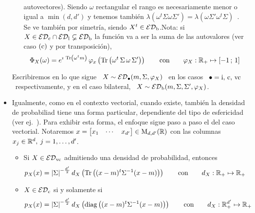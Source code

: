 \begin{itemize}
\begin{itemize}
  autovectores). Siendo $\omega$ rectangular  el rango es necesariamente menor o
  igual  a  $\min(d,d')$ y  tenemos  tambi\'en  $\lambda(\omega^t \Sigma  \omega
  \Sigma')          =          \lambda(\omega          \Sigma'          \omega^t
  \Sigma)$~\cite[Teo.~21.10.1(2)]{Har08}.   Se   ve  tambi\'en  por  simetr\'ia,
  siendo  $X^t \in  \mathcal{ED}_{\mathrm{b}}$.\newline Nota:  si $X  \in \mathcal{ED}_{\mathrm{c}}  \cap \mathcal{ED}_{\mathrm{l}}
  \varsubsetneq \mathcal{ED}_{\mathrm{b}}$ la funci\'on va a  ser la suma de las autovalores (ver
  caso $(\mathrm{c})$ y por transposici\'on), \ie
  \[
  \Phi_X(\omega) = e^{\imath \, \operatorname{Tr}\left( \omega^t m \right)} \, \varphi_x\left(
    \operatorname{Tr}\left( \omega^t \, \Sigma \, \omega \, \Sigma' \right) \right) \qquad
  \mbox{con} \qquad \varphi_X: \mathbb{R}_+ \mapsto [-1 \, ; \, 1]
  \]
  \end{itemize}
  Escribiremos en lo  que sigue \ $X \sim  \mathcal{ED}_\bullet(m,\Sigma,\varphi_X)$ \ en
  los casos  \ $\bullet = \mathrm{i},  \, \mathrm{c}, \,  \mathrm{vc}$ \ respectivamente, y  en el
  caso bilateral, \ $X \sim \mathcal{ED}_{\mathrm{b}}(m,\Sigma,\Sigma',\varphi_X)$.
%
\item Igualmente,  como en  el contexto vectorial,  cuando existe,  tambi\'en la
  densidad de  probabiliad tiene una  forma particular, dependiente del  tipo de
  esfericidad (ver ej.~\cite{Chm80, FraNg80, Kar81:1, Kar81, FanChe84, JenGoo81,
    GupNag99}). Para  exhibir esta forma,  el enfoque sigue  paso a paso  el del
  caso   vectorial.   Notaremos   $x   =   \begin{bmatrix}  x_1   &   \cdots   &
    x_{d'}  \end{bmatrix}  \in \mathrm{M}_{d,d'}(\mathbb{R})$  con  las  columnas $x_j  \in
  \mathbb{R}^d, \: j = 1, \ldots , d'$.
  \begin{itemize}
  \item Si  $X \in \mathcal{ED}_{\mathrm{vc}}$  admitiendo una densidad  de probabilidad,
    entonces
  \[
  p_X(x)  = \left|  \Sigma \right|^{-\frac{d'}{2}}  d_X\left(  \operatorname{Tr}\left( (x-m)^t
      \Sigma^{-1} (x-m)  \right) \right)  \qquad \mbox{con} \qquad  d_X: \mathbb{R}_+
  \mapsto \mathbb{R}_+
  \]
  \item $X \in \mathcal{ED}_{\mathrm{c}}$ si y solamente si
  \[
  p_X(x) =  \left| \Sigma \right|^{-\frac{d'}{2}}  d_X\left( \operatorname{diag}\left( (x-m)^t
      \Sigma^{-1}   (x-m)  \right)   \right)  \qquad   \mbox{con}   \qquad  d_X:
  \mathbb{R}_+^{d'} \mapsto \mathbb{R}_+
\]
\end{itemize}
\end{itemize}
